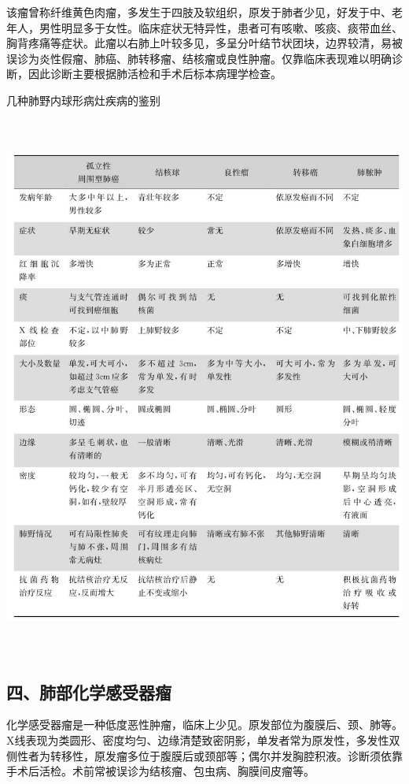 该瘤曾称纤维黄色肉瘤，多发生于四肢及软组织，原发于肺者少见，好发于中、老年人，男性明显多于女性。临床症状无特异性，患者可有咳嗽、咳痰、痰带血丝、胸背疼痛等症状。此瘤以右肺上叶较多见，多呈分叶结节状团块，边界较清，易被误诊为炎性假瘤、肺癌、肺转移瘤、结核瘤或良性肿瘤。仅靠临床表现难以明确诊断，因此诊断主要根据肺活检和手术后标本病理学检查。

\begin{table}[htbp]
\centering
\caption{几种肺野内球形病灶疾病的鉴别}
\label{tab9-3}
\includegraphics[width=5.98958in,height=7.0625in]{./images/Image00067.jpg}
\end{table}

\subsection{四、肺部化学感受器瘤}

化学感受器瘤是一种低度恶性肿瘤，临床上少见。原发部位为腹膜后、颈、肺等。X线表现为类圆形、密度均匀、边缘清楚致密阴影，单发者常为原发性，多发性双侧性者为转移性，原发瘤多位于腹膜后或颈部等；偶尔并发胸腔积液。诊断须依靠手术后活检。术前常被误诊为结核瘤、包虫病、胸膜间皮瘤等。

